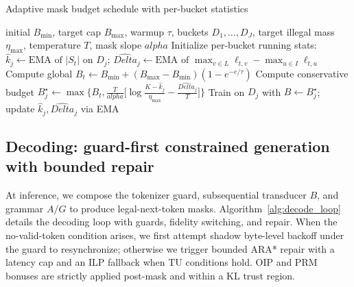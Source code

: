 \documentclass{article}
\def\alpha{alpha}%
\def\Delta{Delta}%
\def\mathcal#1{#1}%
\def\;{ }%
\begin{document}
\begin{algorithm}[h]
\caption{Adaptive mask budget schedule with per-bucket statistics}
\label{alg:budget_schedule}
\begin{algorithmic}[1]
\Require initial $B_{\min}$, target cap $B_{\max}$, warmup $\tau$, buckets $\mathcal{D}_1,\dots,\mathcal{D}_J$, target illegal mass $\eta_{\max}$, temperature $T$, mask slope $\alpha$
\State Initialize per-bucket running stats: $\widehat{k}_j \gets \text{EMA of }|\mathcal{S}_t|$ on $\mathcal{D}_j$; $\widehat{\Delta}_j \gets \text{EMA of }\max_{v\in L}\ell_{t,v}-\max_{u\in I}\ell_{t,u}$
  \State Compute global $B_t \gets B_{\min} + (B_{\max}-B_{\min})(1-e^{-e/\tau})$
     \State Compute conservative budget $B_j^\star \gets \max\!\Big\{B_t,\; \frac{T}{\alpha}\Big[\log\frac{K-\widehat{k}_j}{\eta_{\max}} - \frac{\widehat{\Delta}_j}{T}\Big]\Big\}$ 
     \State Train on $\mathcal{D}_j$ with $B\gets B_j^\star$; update $\widehat{k}_j,\widehat{\Delta}_j$ via EMA
  \EndFor
\EndFor
\end{algorithmic}
\end{algorithm}

\subsection{Decoding: guard-first constrained generation with bounded repair}
At inference, we compose the tokenizer guard, subsequential transducer $\mathcal{B}$, and grammar $\mathcal{A}/\mathcal{G}$ to produce legal-next-token masks. Algorithm~\ref{alg:decode_loop} details the decoding loop with guards, fidelity switching, and repair. When the no-valid-token condition arises, we first attempt shadow byte-level backoff under the guard to resynchronize; otherwise we trigger bounded ARA* repair with a latency cap and an ILP fallback when TU conditions hold. OIP and PRM bonuses are strictly applied post-mask and within a KL trust region.
\end{document}

